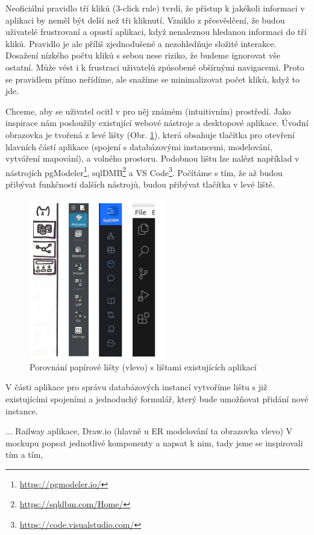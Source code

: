 Neoficiální pravidlo tří kliků (3-click rule) tvrdí, že přístup k jakékoli informaci v aplikaci by neměl být delší než tři kliknutí. Vzniklo z přesvědčení, že budou uživatelé frustrovaní a opustí aplikaci, když nenaleznou hledanou informaci do tří kliků. Pravidlo je ale příliš zjednodušené a nezohledňuje složité interakce. Dosažení nízkého počtu kliků s sebou nese riziko, že budeme ignorovat vše ostatní. Může vést i k frustraci uživatelů způsobené obšírnými navigacemi. Proto se pravidlem přímo neřídíme, ale snažíme se minimalizovat počet kliků, když to jde.

Chceme, aby se uživatel ocitl v pro něj známém (intuitivním) prostředí. Jako inspirace nám posloužily existující webové nástroje a desktopové aplikace. Úvodní obrazovka je tvořená z levé lišty (Obr. \ref{obr05:listy}), která obsahuje tlačítka pro otevření hlavních částí aplikace (spojení s databázovými instancemi, modelování, vytváření mapování), a volného prostoru. Podobnou lištu lze nalézt například v nástrojích pgModeler\footnote{\url{https://pgmodeler.io/}}, sqlDMB\footnote{\url{https://sqldbm.com/Home/}} a VS Code\footnote{\url{https://code.visualstudio.com/}}. Počítáme s tím, že až budou přibývat funkčnosti dalších nástrojů, budou přibývat tlačítka v levé liště.

\begin{figure}[htb]
  \centering
  \includegraphics[height=70mm]{../img/listy}
  \caption{Porovnání papírové lišty (vlevo) s lištami existujících aplikací}
  \label{obr05:listy}
\end{figure}

V části aplikace pro správu databázových instancí vytvoříme lištu s již existujícími spojeními a jednoduchý formulář, který bude umožňovat přidání nové instance.

  ... Railway aplikace, Draw.io (hlavně u ER modelování ta obrazovka vlevo) 
V mockupu popsat jednotlivé komponenty a napsat k nim, tady jsme se inspirovali tím a tím,

